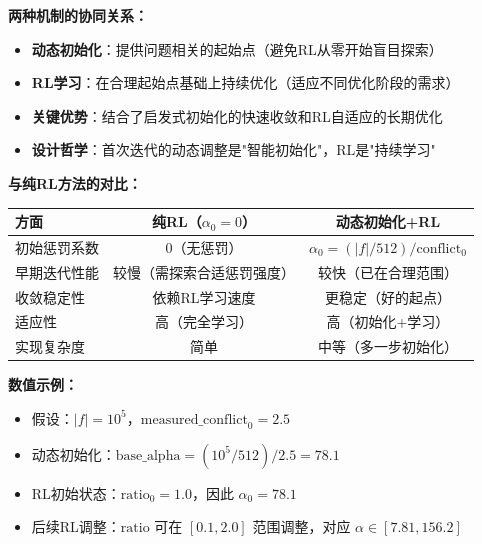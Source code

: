 \documentclass[11pt,a3paper]{ctexart}
\begin{document}
\textbf{两种机制的协同关系：}
\begin{itemize}
    \item \textbf{动态初始化}：提供问题相关的起始点（避免RL从零开始盲目探索）
    \item \textbf{RL学习}：在合理起始点基础上持续优化（适应不同优化阶段的需求）
    \item \textbf{关键优势}：结合了启发式初始化的快速收敛和RL自适应的长期优化
    \item \textbf{设计哲学}：首次迭代的动态调整是"智能初始化"，RL是"持续学习"
\end{itemize}

\textbf{与纯RL方法的对比：}
\begin{center}
\begin{tabular}{|l|c|c|}
\hline
\textbf{方面} & \textbf{纯RL（$\alpha_0=0$）} & \textbf{动态初始化+RL} \\
\hline
初始惩罚系数 & 0（无惩罚） & $\alpha_0 = (|f|/512) / \text{conflict}_0$ \\
\hline
早期迭代性能 & 较慢（需探索合适惩罚强度） & 较快（已在合理范围） \\
\hline
收敛稳定性 & 依赖RL学习速度 & 更稳定（好的起点） \\
\hline
适应性 & 高（完全学习） & 高（初始化+学习） \\
\hline
实现复杂度 & 简单 & 中等（多一步初始化） \\
\hline
\end{tabular}
\end{center}

\textbf{数值示例：}
\begin{itemize}
    \item 假设：$|f| = 10^5$，$\text{measured\_conflict}_0 = 2.5$
    \item 动态初始化：$\text{base\_alpha} = (10^5 / 512) / 2.5 = 78.1$
    \item RL初始状态：$\text{ratio}_0 = 1.0$，因此 $\alpha_0 = 78.1$
    \item 后续RL调整：$\text{ratio}$ 可在 $[0.1, 2.0]$ 范围调整，对应 $\alpha \in [7.81, 156.2]$
\end{itemize}
\end{document}
